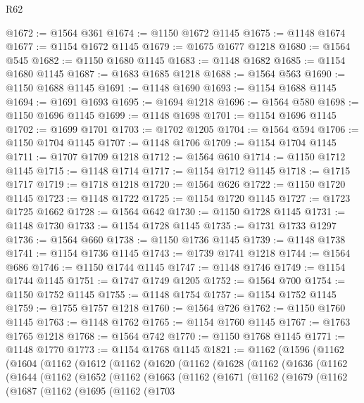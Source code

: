 \begin{lexlean}{R62}
\begin{coremodule}
@1672 := @1564 @361
@1674 := @1150 @1672 @1145
@1675 := @1148 @1674
@1677 := @1154 @1672 @1145
@1679 := @1675 @1677 @1218
@1680 := @1564 @545
@1682 := @1150 @1680 @1145
@1683 := @1148 @1682
@1685 := @1154 @1680 @1145
@1687 := @1683 @1685 @1218
@1688 := @1564 @563
@1690 := @1150 @1688 @1145
@1691 := @1148 @1690
@1693 := @1154 @1688 @1145
@1694 := @1691 @1693
@1695 := @1694 @1218
@1696 := @1564 @580
@1698 := @1150 @1696 @1145
@1699 := @1148 @1698
@1701 := @1154 @1696 @1145
@1702 := @1699 @1701
@1703 := @1702 @1205
@1704 := @1564 @594
@1706 := @1150 @1704 @1145
@1707 := @1148 @1706
@1709 := @1154 @1704 @1145
@1711 := @1707 @1709 @1218
@1712 := @1564 @610
@1714 := @1150 @1712 @1145
@1715 := @1148 @1714
@1717 := @1154 @1712 @1145
@1718 := @1715 @1717
@1719 := @1718 @1218
@1720 := @1564 @626
@1722 := @1150 @1720 @1145
@1723 := @1148 @1722
@1725 := @1154 @1720 @1145
@1727 := @1723 @1725 @1662
@1728 := @1564 @642
@1730 := @1150 @1728 @1145
@1731 := @1148 @1730
@1733 := @1154 @1728 @1145
@1735 := @1731 @1733 @1297
@1736 := @1564 @660
@1738 := @1150 @1736 @1145
@1739 := @1148 @1738
@1741 := @1154 @1736 @1145
@1743 := @1739 @1741 @1218
@1744 := @1564 @686
@1746 := @1150 @1744 @1145
@1747 := @1148 @1746
@1749 := @1154 @1744 @1145
@1751 := @1747 @1749 @1205
@1752 := @1564 @700
@1754 := @1150 @1752 @1145
@1755 := @1148 @1754
@1757 := @1154 @1752 @1145
@1759 := @1755 @1757 @1218
@1760 := @1564 @726
@1762 := @1150 @1760 @1145
@1763 := @1148 @1762
@1765 := @1154 @1760 @1145
@1767 := @1763 @1765 @1218
@1768 := @1564 @742
@1770 := @1150 @1768 @1145
@1771 := @1148 @1770
@1773 := @1154 @1768 @1145
@1821 := @1162
    (@1596
      (@1162
        (@1604
          (@1162
            (@1612
              (@1162
                (@1620
                  (@1162
                    (@1628
                      (@1162
                        (@1636
                          (@1162
                            (@1644
                              (@1162
                                (@1652
                                  (@1162
                                    (@1663
                                      (@1162
                                        (@1671
                                          (@1162
                                            (@1679
                                              (@1162
                                                (@1687
                                                  (@1162
                                                    (@1695
                                                      (@1162
                                                        (@1703

\end{coremodule}
\end{lexlean}
